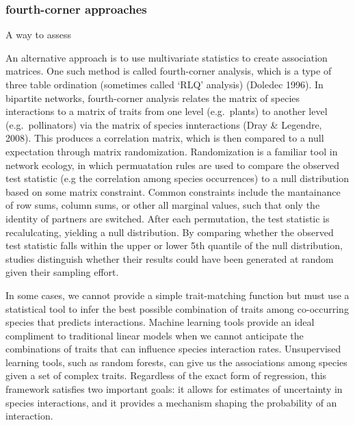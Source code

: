 \subsubsection*{fourth-corner approaches}
\label{fourth-corner approaches}

A way to assess

An alternative approach is to use multivariate statistics to create association
matrices. One such method is called fourth-corner analysis, which is a type of
three table ordination (sometimes called `RLQ' analysis) (Doledec 1996). In
bipartite networks, fourth-corner analysis relates the matrix of species
interactions to a matrix of traits from one level (e.g.~plants) to another level
(e.g.~pollinators) via the matrix of species innteractions (Dray \& Legendre,
2008). This produces a correlation matrix, which is then compared to a null
expectation through matrix randomization. Randomization is a familiar tool in
network ecology, in which permuatation rules are used to compare the observed
test statistic (e.g the correlation among species occurrences) to a null
distribution based on some matrix constraint. Common constraints include the
mantainance of row sums, column sums, or other all marginal values, such that
only the identity of partners are switched. After each permutation, the test
statistic is recalulcating, yielding a null distribution. By comparing whether
the observed test statistic falls within the upper or lower 5th quantile of the
null distribution, studies distinguish whether their results could have been
generated at random given their sampling effort.



In some cases, we cannot provide a simple trait-matching function but must use a
statistical tool to infer the best possible combination of traits among
co-occurring species that predicts interactions. Machine learning tools provide
an ideal compliment to traditional linear models when we cannot anticipate the
combinations of traits that can influence species interaction rates.
Unsupervised learning tools, such as random forests, can give us the
associations among species given a set of complex traits. Regardless of the
exact form of regression, this framework satisfies two important goals: it
allows for estimates of uncertainty in species interactions, and it provides a
mechanism shaping the probability of an interaction.

